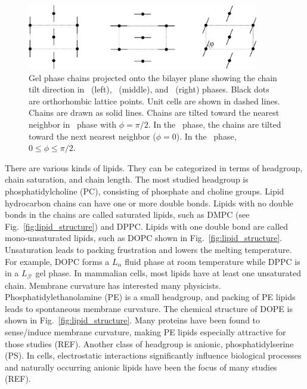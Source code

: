 \begin{figure}[htbp]
  \centering
  \includegraphics[width=0.9\textwidth]{figures/gel_phase_packing}
  \caption{Gel phase chains projected onto the bilayer plane showing 
  the chain tilt direction in \LbetaI\ (left), \LbetaF\ (middle), and
  \LbetaL\ (right) phases. Black dots are orthorhombic lattice points.
  Unit cells are shown in dashed lines.
  Chains are drawn as solid lines. Chains are tilted toward the
  nearest neighbor in \LbetaI\ phase with $\phi=\pi/2$. 
  In the \LbetaF\ phase, the chains are tilted toward the next nearest neighbor
  ($\phi=0$). In the \LbetaL\ phase, $0 \leq \phi \leq \pi/2$.}
  \label{fig:gel_phase_packing}
\end{figure}

There are various kinds of lipids. 
They can be 
categorized in terms of headgroup, chain saturation, and chain length.
The most studied headgroup is phosphatidylcholine (PC),
consisting of phosphate and choline groups. 
Lipid hydrocarbon chains can have one or more double bonds. 
Lipids
with no double bonds in the chains are called saturated lipids,
such as DMPC (see Fig.~\ref{fig:lipid_structure}) and DPPC. 
Lipids with one double bond
are called mono-unsaturated lipids, such as DOPC shown in Fig.~\ref{fig:lipid_structure}.
Unsaturation leads to packing frustration and lowers the melting 
temperature. For example, DOPC forms a $L_{\alpha}$ fluid phase at room temperature
while DPPC is in a $L_{\beta'}$ gel phase.
In mammalian cells, most lipids have at least one unsaturated chain.
Membrane curvature
has interested many physicists. Phosphatidylethanolamine (PE) is a small 
headgroup, and packing of PE lipids leads to spontaneous membrane curvature.
The chemical structure of DOPE is shown in Fig.~\ref{fig:lipid_structure}.
Many proteins have been found to sense/induce membrane curvature, 
making PE lipids especially attractive for those studies (REF).
Another class of headgroup is
anionic, phosphatidylserine (PS). In cells, electrostatic interactions
significantly influence biological processes and naturally occurring anionic
lipids have been the focus of many studies (REF).


